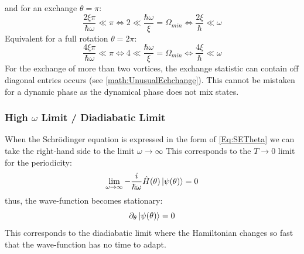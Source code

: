 \documentclass[Master]{subfiles}
\begin{document}
and for an exchange $\theta = \pi$:
$$\frac{2 \xi \pi}{\hbar \omega } \ll \pi \Leftrightarrow 2 \ll \frac{\hbar \omega } {\xi} = \Omega_{min} \Leftrightarrow\frac{2\xi }{\hbar} \ll \omega  $$
Equivalent for a full rotation $\theta = 2 \pi$:
$$\frac{4 \xi \pi}{\hbar \omega } \ll \pi \Leftrightarrow 4 \ll \frac{\hbar \omega } {\xi} = \Omega_{min} \Leftrightarrow\frac{4\xi }{\hbar } \ll \omega  $$
For the exchange of more than two vortices, the exchange statistic can contain off diagonal entries occurs (see \eqref{math:UnusualEchchange}). This cannot be mistaken for a dynamic phase as the dynamical phase does not mix states.
\mypagebreak
\subsubsection{High $\omega$ Limit / Diadiabatic Limit}
When the Schrödinger equation is expressed in the form of \eqref{Eq:SETheta} we can take the right-hand side to the limit $\omega \rightarrow \infty$
This corresponds to the $T\rightarrow 0$ limit for the periodicity:
$$\lim_{\omega \rightarrow \infty} -\frac{  i }{\hbar \omega}\hat{H}(\theta)\ket{\psi(\theta)} = 0$$
thus, the wave-function becomes stationary:
$$\partial_{\theta} \ket{\psi(\theta)} = 0$$
This corresponds to the diadiabatic limit where the Hamiltonian changes so fast that the wave-function has no time to adapt.
\end{document}
